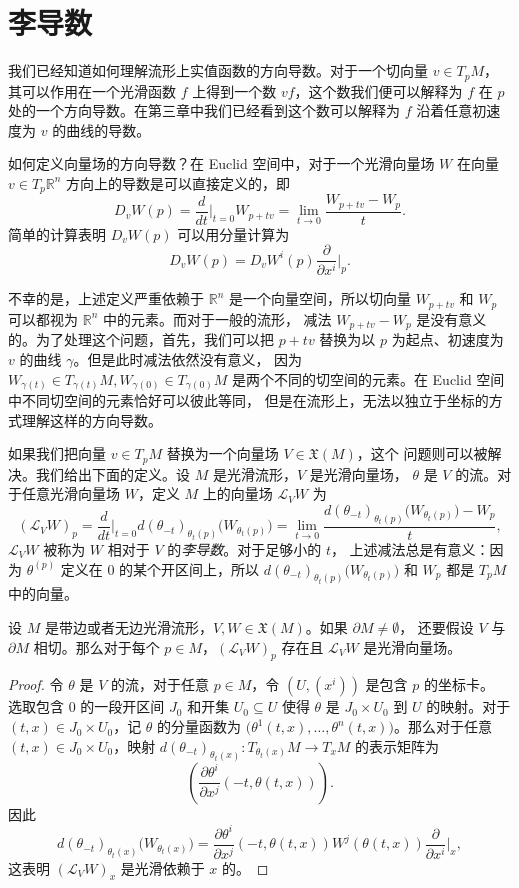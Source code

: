 \section{李导数}

我们已经知道如何理解流形上实值函数的方向导数。对于一个切向量 $v\in T_pM$，
其可以作用在一个光滑函数 $f$ 上得到一个数 $vf$，这个数我们便可以解释为 $f$
在 $p$ 处的一个方向导数。在第三章中我们已经看到这个数可以解释为 $f$
沿着任意初速度为 $v$ 的曲线的导数。

如何定义向量场的方向导数？在 Euclid 空间中，对于一个光滑向量场 $W$
在向量 $v\in T_p \mathbb{R}^n$ 方向上的导数是可以直接定义的，即
\[
  D_vW(p)=\frac{d}{dt}\bigg|_{t=0}W_{p+tv}=
  \lim_{t\to 0}\frac{W_{p+tv}-W_p}{t}.
\]
简单的计算表明 $D_vW(p)$ 可以用分量计算为
\[
  D_vW(p)=D_vW^i(p)\frac{\partial}{\partial x^i}\bigg|_p.
\]

不幸的是，上述定义严重依赖于 $\mathbb{R}^n$ 是一个向量空间，所以切向量
$W_{p+tv}$ 和 $W_p$ 可以都视为 $\mathbb{R}^n$ 中的元素。而对于一般的流形，
减法 $W_{p+tv}-W_p$ 是没有意义的。为了处理这个问题，首先，我们可以把 $p+tv$
替换为以 $p$ 为起点、初速度为 $v$ 的曲线 $\gamma$。但是此时减法依然没有意义，
因为 $W_{\gamma(t)}\in T_{\gamma(t)}M, W_{\gamma(0)}\in T_{\gamma(0)}M$
是两个不同的切空间的元素。在 Euclid 空间中不同切空间的元素恰好可以彼此等同，
但是在流形上，无法以独立于坐标的方式理解这样的方向导数。

如果我们把向量 $v\in T_pM$ 替换为一个向量场 $V\in \mathfrak X(M)$，这个
问题则可以被解决。我们给出下面的定义。设 $M$ 是光滑流形，$V$ 是光滑向量场，
$\theta$ 是 $V$ 的流。对于任意光滑向量场 $W$，定义 $M$ 上的向量场 $\mathcal L_VW$
为
\[
  (\mathcal L_VW)_p=\frac{d}{dt}\bigg|_{t=0}d(\theta_{-t})_{\theta_t(p)}\bigl(W_{\theta_t(p)}\bigr)
  =\lim_{t\to 0}\frac{d(\theta_{-t})_{\theta_t(p)}\bigl(W_{\theta_t(p)}\bigr)-W_p}{t},
\]
$\mathcal L_VW$ 被称为 $W$ 相对于 $V$ 的\emph{李导数}。对于足够小的 $t$，
上述减法总是有意义：因为 $\theta^{(p)}$ 定义在 $0$ 的某个开区间上，所以 
$d(\theta_{-t})_{\theta_t(p)}\bigl(W_{\theta_t(p)}\bigr)$ 和 $W_p$ 都是 $T_pM$ 中的向量。

\begin{lemma}\label{lemma:lie derivation is smooth}
  设 $M$ 是带边或者无边光滑流形，$V,W\in \mathfrak X(M)$。如果 $\partial M\neq\emptyset$，
  还要假设 $V$ 与 $\partial M$ 相切。那么对于每个 $p\in M$，$(\mathcal L_VW)_p$ 存在且
  $\mathcal L_VW$ 是光滑向量场。
\end{lemma}
\begin{proof}
  令 $\theta$ 是 $V$ 的流，对于任意 $p\in M$，令 $(U,(x^i))$ 是包含 $p$ 的坐标卡。
  选取包含 $0$ 的一段开区间 $J_0$ 和开集 $U_0\subseteq U$ 使得 $\theta$
  是 $J_0\times U_0$ 到 $U$ 的映射。对于 $(t,x)\in J_0\times U_0$，记 $\theta$
  的分量函数为 $\bigl(\theta^1(t,x),\dots,\theta^n(t,x)\bigr)$。那么对于任意
  $(t,x)\in J_0\times U_0$，映射 $d(\theta_{-t})_{\theta_t(x)}:T_{\theta_t(x)}M\to T_{x}M$
  的表示矩阵为
  \[
    \left(\frac{\partial \theta^i}{\partial x^j}(-t,\theta(t,x))\right).
  \]
  因此
  \[
    d(\theta_{-t})_{\theta_t(x)}\bigl(W_{\theta_t(x)}\bigr)
    =\frac{\partial \theta^i}{\partial x^j}(-t,\theta(t,x))W^j(\theta(t,x))
    \frac{\partial}{\partial x^i}\bigg|_{x},
  \]
  这表明 $(\mathcal L_VW)_x$ 是光滑依赖于 $x$ 的。
\end{proof}

